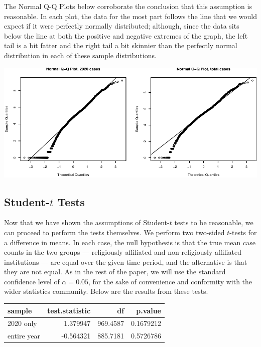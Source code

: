 \documentclass[
]{article}
\begin{document}
The Normal Q-Q Plots below corroborate the conclusion that this
assumption is reasonable. In each plot, the data for the most part
follows the line that we would expect if it were perfectly normally
distributed; although, since the data sits below the line at both the
positive and negative extremes of the graph, the left tail is a bit
fatter and the right tail a bit skinnier than the perfectly normal
distribution in each of these sample distributions.

\includegraphics{final_files/figure-latex/unnamed-chunk-9-1.pdf}

\hypertarget{student-t-tests}{%
\subsection{\texorpdfstring{Student-\(t\)
Tests}{Student-t Tests}}\label{student-t-tests}}

Now that we have shown the assumptions of Student-\(t\) tests to be
reasonable, we can proceed to perform the tests themselves. We perform
two two-sided \(t\)-tests for a difference in means. In each case, the
null hypothesis is that the true mean case counts in the two groups ---
religiously affiliated and non-religiously affiliated institutions ---
are equal over the given time period, and the alternative is that they
are not equal. As in the rest of the paper, we will use the standard
confidence level of \(\alpha = 0.05\), for the sake of convenience and
conformity with the wider statistics community. Below are the results
from these tests.

\begin{longtable}[]{@{}lrrr@{}}
\toprule()
sample & test.statistic & df & p.value \\
\midrule()
\endhead
2020 only & 1.379947 & 969.4587 & 0.1679212 \\
entire year & -0.564321 & 885.7181 & 0.5726786 \\
\bottomrule()
\end{longtable}
\end{document}
